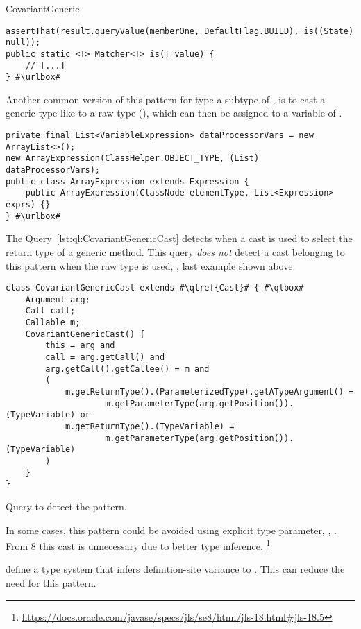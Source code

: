 \begin{pattern}{CovariantGeneric}
\def\urlvar{http://bit.ly/EngineHub_WorldGuard_2IVUOx1}
\begin{verbatim}
assertThat(result.queryValue(memberOne, DefaultFlag.BUILD), is((State) null));
public static <T> Matcher<T> is(T value) {
    // [...]
} #\urlbox#
\end{verbatim}

Another common version of this pattern for type  a subtype of ,
is to cast a generic type like  to a raw type (),
which can then be assigned to a variable of .
\def\urlvar{http://bit.ly/spockframework_spock_2UYEsF5}
\begin{verbatim}
private final List<VariableExpression> dataProcessorVars = new ArrayList<>();
new ArrayExpression(ClassHelper.OBJECT_TYPE, (List) dataProcessorVars);
public class ArrayExpression extends Expression {
    public ArrayExpression(ClassNode elementType, List<Expression> exprs) {}
} #\urlbox#
\end{verbatim}


\detection{}
The Query~\ref{lst:ql:CovariantGenericCast} detects when a cast is used to select the return type of a generic method.
This query \emph{does not} detect a cast belonging to this pattern when the raw type is used, \eg{}, last example shown above.

\begin{listing}
\begin{verbatim}
class CovariantGenericCast extends #\qlref{Cast}# { #\qlbox#
	Argument arg;
	Call call;
	Callable m;
	CovariantGenericCast() {
		this = arg and
		call = arg.getCall() and
		arg.getCall().getCallee() = m and
		(
			m.getReturnType().(ParameterizedType).getATypeArgument() =
					m.getParameterType(arg.getPosition()).(TypeVariable) or
			m.getReturnType().(TypeVariable) =
					m.getParameterType(arg.getPosition()).(TypeVariable)
		)
	}
}
\end{verbatim}
\caption{Query to detect the \thisp{} pattern.}
\label{lst:ql:CovariantGenericCast}
\end{listing}


\issues{}
In some cases, this pattern could be avoided using explicit type parameter,
\eg{}, .
From \java{} 8 this cast is unnecessary due to better type inference.%
\footnote{\url{https://docs.oracle.com/javase/specs/jls/se8/html/jls-18.html\#jls-18.5}}

\cite{altidorTamingWildcardsCombining2011} define a type system that infers definition-site variance to \java{}.
This can reduce the need for this pattern.

\end{pattern}
